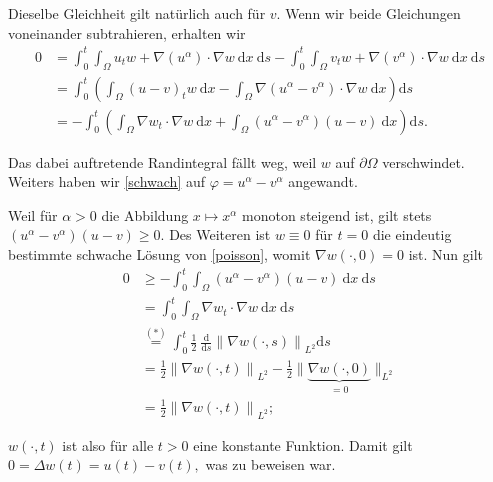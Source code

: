 \begin{solution}
Dieselbe Gleichheit gilt natürlich auch für $v.$ Wenn wir beide Gleichungen voneinander subtrahieren, erhalten wir
\begin{align*}
    0 &= \int_0^t \int_\Omega u_t w + \nabla(u^\alpha) \cdot \nabla w \mathrm{~d}x \mathrm{~d}s - \int_0^t \int_\Omega v_t w + \nabla(v^\alpha) \cdot \nabla w \mathrm{~d}x \mathrm{~d}s\\
    &= \int_0^t \left(\int_\Omega (u-v)_t w \mathrm{~d}x - \int_\Omega \nabla(u^\alpha - v^\alpha) \cdot \nabla w \mathrm{~d}x\right) \mathrm{d}s\\
    &= - \int_0^t \left(\int_\Omega \nabla w_t \cdot \nabla w \mathrm{~d}x + \int_\Omega (u^\alpha - v^\alpha) (u-v) \mathrm{~d}x\right)\mathrm{d}s.
\end{align*}

Das dabei auftretende Randintegral fällt weg, weil $w$ auf $\partial\Omega$ verschwindet. Weiters haben wir \eqref{schwach} auf $\varphi = u^\alpha - v^\alpha$ angewandt.

Weil für $\alpha > 0$ die Abbildung $x \mapsto x^\alpha$ monoton steigend ist, gilt stets $(u^\alpha - v^\alpha) (u-v) \geq 0.$ Des Weiteren ist $w \equiv 0$ für $t = 0$ die eindeutig bestimmte schwache Lösung von \eqref{poisson}, womit $\nabla w(\cdot, 0) = 0$ ist. Nun gilt
\begin{align*}
    0 &\geq - \int_0^t \int_\Omega (u^\alpha - v^\alpha) (u-v) \mathrm{~d}x \mathrm{~d}s\\
    &= \int_0^t \int_\Omega \nabla w_t \cdot \nabla w \mathrm{~d}x \mathrm{~d}s\\
    &\stackrel{(\ast)}{=} \int_0^t \frac{1}{2} ~\frac{\mathrm{d}}{\mathrm{d}s} \left\| \nabla w(\cdot, s)\right\|_{L^2} \mathrm{d}s\\
    &= \frac{1}{2} \left\| \nabla w(\cdot, t)\right\|_{L^2} - \frac{1}{2} \| \underbrace{\nabla w(\cdot, 0)}_{=0}\|_{L^2}\\
    &= \frac{1}{2} \left\| \nabla w(\cdot, t)\right\|_{L^2};
\end{align*}

$w(\cdot, t)$ ist also für alle $t > 0$ eine konstante Funktion. Damit gilt $0 = \Delta w(t) = u(t) - v(t),$ was zu beweisen war.


\end{solution}
